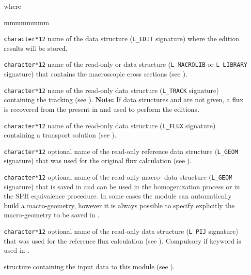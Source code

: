 \noindent
where
\begin{ListeDeDescription}{mmmmmmmm}

\item[\dusa{EDINAM}] {\tt character*12} name of the  data
structure ({\tt L\_EDIT} signature) where the edition results will be stored.

\item[\dusa{LIBNAM}] {\tt character*12} name of the read-only  or
 data structure ({\tt L\_MACROLIB} or {\tt L\_LIBRARY} signature) that contains the
macroscopic cross sections (see ).

\item[\dusa{TRKNAM}] {\tt character*12} name of the read-only  data
structure ({\tt L\_TRACK} signature) containing the tracking (see ). {\bf Note:} If data
structures  and  are not given, a flux is recovered from the 
present in  and used to perform the editions.

\item[\dusa{FLUNAM}] {\tt character*12} name of the read-only  data
structure ({\tt L\_FLUX} signature) containing a transport solution (see ).

\item[\dusa{REFGEO}] {\tt character*12} optional name of the read-only reference  data
structure ({\tt L\_GEOM} signature) that was used for the original flux calculation (see ).

\item[\dusa{MACROGEO}] {\tt character*12} optional name of the read-only macro- data
structure ({\tt L\_GEOM} signature) that is saved in  and can be used in the homogenization
process or in the SPH equivalence procedure. In some cases the
module  can automatically build a macro-geometry, however it is always
possible to specify explicitly the macro-geometry to be saved in .

\item[\dusa{REFPIJ}] {\tt character*12} optional name of the read-only  data
structure ({\tt L\_PIJ} signature) that was used for the reference flux calculation (see ).
Compulsory if keyword  is used in .

\item[\dstr{descedi}] structure containing the input data to this module
(see ).

\end{ListeDeDescription}

